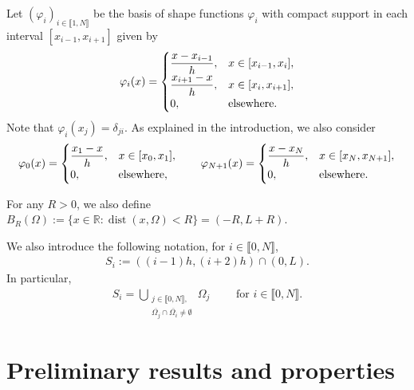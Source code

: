 \documentclass[11 pt]{article}
\newcommand\inter[1]{\llbracket #1\rrbracket}
\numberwithin{equation}{section}
\def\dist{\operatorname{dist}}
\def\R{\mathbb{R}}
\begin{document}
Let $(\varphi_i)_{i\in\inter{1,N}}$ be the basis of shape functions $\varphi_i$ with compact support in each interval $[x_{i-1},x_{i+1}]$ given by
%
\begin{align}\label{eq:def_basis}
 \varphi_i(x)=\begin{cases}
        \displaystyle \frac{x-x_{i-1}}{h}, &x\in[x_{i-1},x_i], \\
        \displaystyle \frac{x_{i+1}-x}{h}, &x\in [x_i,x_{i+1}], \\
        0, &\textnormal{elsewhere}.
    \end{cases}
\end{align}
Note that $\varphi_i(x_j)=\delta_{ji}$.  As explained in the introduction, we also consider
%
\begin{align}\label{eq:def_basis_ext}
    \varphi_0(x)=\begin{cases}
        \displaystyle \frac{x_{1}-x}{h}, &x\in [x_0,x_{1}], \\
        0, &\textnormal{elsewhere},
    \end{cases} \qquad \varphi_{N+1}(x)=\begin{cases}
        \displaystyle \frac{x-x_{N}}{h}, &x\in[x_{N},x_{N+1}], \\
        0, &\textnormal{elsewhere.}
    \end{cases}
\end{align}
%

For any $R>0$, we also define $B_{R}(\Omega):=\{x\in\R:\dist(x,\Omega)<R\}=(-R,L+R)$.

We also introduce the following notation, for $i\in \inter{0,N}$,
\begin{align}\label{eq:def_Si}
S_{i}:=((i-1)h,(i+2)h)\cap (0,L).
\end{align}
 In particular,
\begin{align*}
    S_i=\bigcup_
    {
    {\substack{j\in\inter{0,N},\\ \overline{\Omega_j}\cap \overline{\Omega_i}\neq \emptyset}}
    }\Omega_j \qquad \text{ for } i\in\inter{0,N}.
\end{align*}
%
%
%


\section{Preliminary results and properties}\label{sec:three}
\end{document}
